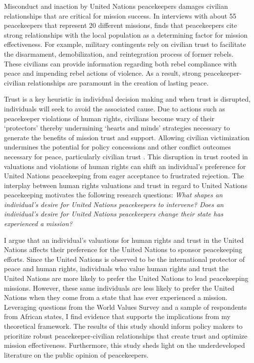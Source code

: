 \documentclass[12pt]{article}
\newcommand{\UN}[1]{United Nations}
\begin{document}

Misconduct and inaction by United Nations peacekeepers damages civilian relationships that are critical for mission success. In interviews with about 55 peacekeepers that represent 20 different missions, \cite{furnari2015relationships} finds that peacekeepers cite strong relationships with the local population as a determining factor for mission effectiveness. For example, military contingents rely on civilian trust to facilitate the disarmament, demobilization, and reintegration process of former rebels. These civilians can provide information regarding both rebel compliance with peace and impending rebel actions of violence. As a result, strong peacekeeper-civilian relationships are paramount in the creation of lasting peace. 

Trust is a key heuristic in individual decision making \citep{carlin2013politics} and when trust is disrupted, individuals will seek to avoid the associated cause. Due to actions such as peacekeeper violations of human rights, civilians become wary of their `protectors' thereby undermining `hearts and minds' strategies necessary to generate the benefits of mission trust and support. Allowing civilian victimization undermines the potential for policy concessions and other conflict outcomes necessary for peace, particularly civilian trust \citep[Ex.][]{de2016civil,ottmann2017rebel,krcmaric2018varieties}. This disruption in trust rooted in valuations and violations of human rights can shift an individual's preference for United Nations peacekeeping from eager acceptance to frustrated rejection. The interplay between human rights valuations and trust in regard to United Nations peacekeeping motivates the following research questions: \textit{What shapes an individual's desire for United Nations peacekeepers to intervene? Does an individual's desire for United Nations peacekeepers change their state has experienced a mission?} 

I argue that an individual's valuations for human rights and trust in the United Nations affects their preference for the United Nations to sponsor peacekeeping efforts. Since the United Nations is observed to be the international protector of peace and human rights, individuals who value human rights and trust the \UN{} are more likely to prefer the \UN{} to lead peacekeeping missions. However, these same individuals are less likely to prefer the \UN{} when they come from a state that has ever experienced a mission. Leveraging questions from the World Values Survey and a sample of respondents from African states, I find evidence that supports the implications from my theoretical framework. The results of this study should inform policy makers to prioritize robust peacekeeper-civilian relationships that create trust and optimize mission effectiveness. Furthermore, this study sheds light on the underdeveloped literature on the public opinion of peacekeepers. 
\end{document}
